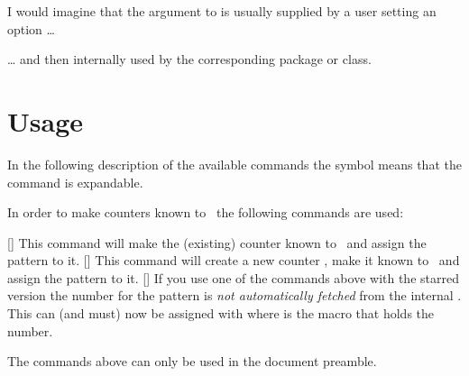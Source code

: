 \documentclass[load-preamble+]{cnltx-doc}
\begin{document}
\begin{example}
\end{example}

I would imagine that the argument to  is usually
supplied by a user setting an option \ldots
\begin{sourcecode}
\end{sourcecode}
\ldots{} and then internally used by the corresponding package or class.


\section{Usage}
In the following description of the available commands the symbol
\textcolor{expandable}{\expandablesign} means that the command is expandable.

In order to make counters known to \cntformats\ the following commands are used:
\begin{commands}
  [\sarg{}]
    This command will make the (existing) counter  known to
    \cntformats\ and assign the pattern  to it.
  [\sarg{}]
    This command will create a new counter , make it known to
    \cntformats\ and assign the pattern  to it.
  []
    If you use one of the commands above with the starred version the number
    for the pattern is \emph{not automatically fetched} from the internal
    .  This can (and must) now be assigned with
      where  is the macro that holds
    the number.
\end{commands}
The commands above can only be used in the document preamble.
\end{document}
